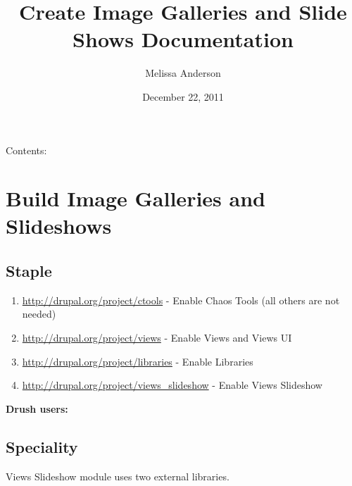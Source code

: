 \documentclass[letterpaper,10pt,english]{sphinxmanual}
\title{Create Image Galleries and Slide Shows Documentation}
\date{December 22, 2011}
\author{Melissa Anderson}
\begin{document}
\maketitle
\tableofcontents
{}\label{index::doc}


Contents:


\chapter{Build Image Galleries and Slideshows}
\label{recipe:build-image-galleries-and-slideshows}\label{recipe:welcome-to-create-image-galleries-and-slide-shows-s-documentation}\label{recipe::doc}

\section{Staple}
\label{recipe:staple}\begin{enumerate}
\item {} 
\href{http://drupal.org/project/ctools}{http://drupal.org/project/ctools} - Enable Chaos Tools (all others are not needed)

\item {} 
\href{http://drupal.org/project/views}{http://drupal.org/project/views} - Enable Views and Views UI

\item {} 
\href{http://drupal.org/project/libraries}{http://drupal.org/project/libraries} - Enable Libraries

\item {} 
\href{http://drupal.org/project/views\_slideshow}{http://drupal.org/project/views\_slideshow} - Enable Views Slideshow

\end{enumerate}
\begin{description}
\item[{\textbf{Drush users:}}] \leavevmode
{}

\end{description}


\section{Speciality}
\label{recipe:speciality}
Views Slideshow module uses two external libraries.
\end{document}
